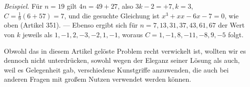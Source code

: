 \textit{Beispiel.} Für \(n=19\) gilt \(4n=49+27\), also \(3k-2=+7,\allowbreak k=3\), \(C=\frac19(6+57)=7\), und die gesuchte Gleichung ist \(x^3+xx-6x-7=0\), wie oben (Artikel 351). — Ebenso ergibt sich für \(n=7,\allowbreak 13,\allowbreak 31,\allowbreak 37,\allowbreak 43,\allowbreak 61,\allowbreak 67\) der Wert von \(k\) jeweils als \(1,\allowbreak -1,\allowbreak 2,\allowbreak -3,\allowbreak -2,\allowbreak 1,\allowbreak -1\), woraus \(C=1,\allowbreak -1,\allowbreak 8,\allowbreak -11,\allowbreak -8,\allowbreak 9,\allowbreak -5\) folgt.

Obwohl das in diesem Artikel gelöste Problem recht verwickelt ist, wollten wir es dennoch nicht unterdrücken, sowohl wegen der Eleganz seiner Lösung als auch, weil es Gelegenheit gab, verschiedene Kunstgriffe anzuwenden, die auch bei anderen Fragen mit großem Nutzen verwendet werden können.

